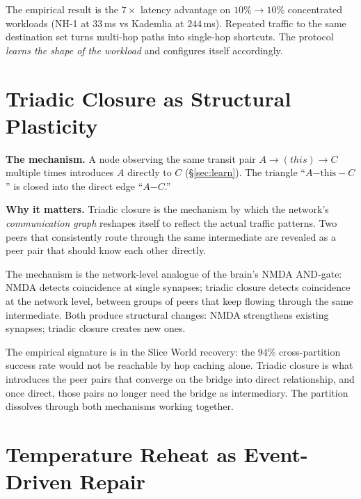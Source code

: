 \documentclass[twoside,nobib]{tufte-book}
\begin{document}
The empirical result is the $7\times$ latency advantage on
$10\% \to 10\%$ concentrated workloads (NH-1 at $33$\,ms vs
Kademlia at $244$\,ms). Repeated traffic to the same
destination set turns multi-hop paths into single-hop shortcuts.
The protocol \emph{learns the shape of the workload} and
configures itself accordingly.

\section{Triadic Closure as Structural Plasticity}

\textbf{The mechanism.} A node observing the same transit pair
$A \to (\mathit{this}) \to C$ multiple times introduces $A$
directly to $C$ (\S\ref{sec:learn}). The triangle
``$A \mathrm{-this-} C$'' is closed into the direct edge
``$A \mathrm{-} C$.''

\textbf{Why it matters.} Triadic closure is the mechanism by
which the network's \emph{communication graph} reshapes itself
to reflect the actual traffic patterns. Two peers that
consistently route through the same intermediate are revealed
as a peer pair that should know each other directly.

The mechanism is the network-level analogue of the brain's
NMDA AND-gate: NMDA detects coincidence at single synapses;
triadic closure detects coincidence at the network level, between
groups of peers that keep flowing through the same intermediate.
Both produce structural changes: NMDA strengthens existing
synapses; triadic closure creates new ones.

The empirical signature is in the Slice World recovery: the
$94\%$ cross-partition success rate would not be reachable by
hop caching alone. Triadic closure is what introduces the
peer pairs that converge on the bridge into direct relationship,
and once direct, those pairs no longer need the bridge as
intermediary. The partition dissolves through both mechanisms
working together.

\section{Temperature Reheat as Event-Driven Repair}
\end{document}
